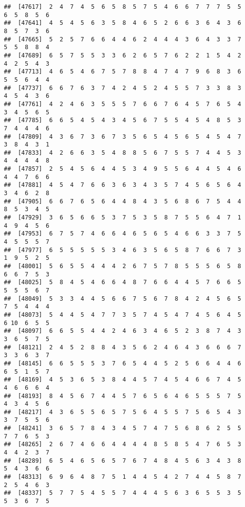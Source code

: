 \documentclass[
]{book}
\begin{document}
\begin{verbatim}
##  [47617]  2  4  7  4  5  6  5  8  5  7  5  4  6  6  7  7  7  5  5  6  5  8  5  6
##  [47641]  4  5  4  5  6  3  5  8  4  6  5  2  6  6  3  6  4  3  6  8  5  7  3  6
##  [47665]  5  2  5  7  6  6  4  4  6  2  4  4  4  3  6  4  3  3  7  5  5  8  8  4
##  [47689]  6  5  7  5  5  3  3  6  2  6  5  7  6  2  2  1  5  4  2  4  2  5  4  3
##  [47713]  4  6  5  4  6  7  5  7  8  8  4  7  4  7  9  6  8  3  6  5  5  6  4  4
##  [47737]  6  6  7  6  3  7  4  2  4  5  2  4  5  5  7  3  3  8  3  4  5  4  3  6
##  [47761]  4  2  4  6  3  5  5  5  7  6  6  7  6  4  5  7  6  5  4  3  4  5  6  5
##  [47785]  6  6  5  4  5  4  3  4  5  6  7  5  5  4  5  4  8  5  3  7  4  4  4  6
##  [47809]  4  3  6  7  3  6  7  3  5  6  5  4  5  6  5  4  5  4  7  3  8  4  3  1
##  [47833]  4  2  6  6  3  5  4  8  8  5  6  7  5  5  7  4  4  5  3  4  4  4  4  8
##  [47857]  2  5  4  5  6  4  4  5  3  4  9  5  5  6  4  4  5  4  6  4  4  7  6  6
##  [47881]  4  5  4  7  6  6  3  6  3  4  3  5  7  4  5  6  5  6  4  3  4  6  2  8
##  [47905]  6  6  7  6  5  6  4  4  8  4  3  5  6  8  6  7  5  4  4  8  5  3  4  5
##  [47929]  3  6  5  6  6  5  3  7  5  3  5  8  7  5  5  6  4  7  1  4  9  4  5  6
##  [47953]  6  7  5  7  4  6  6  4  6  5  6  5  4  6  6  3  3  7  5  4  5  5  5  7
##  [47977]  6  5  5  5  5  5  3  4  6  3  5  6  5  8  7  6  6  7  3  1  9  5  2  5
##  [48001]  5  6  5  5  4  4  4  2  6  7  5  7  8  5  5  5  6  5  8  6  6  7  5  3
##  [48025]  5  8  4  5  4  6  6  4  8  7  6  6  4  4  5  7  6  6  5  5  5  5  6  7
##  [48049]  5  3  3  4  4  5  6  6  7  5  6  7  8  4  2  4  5  6  5  7  5  4  4  4
##  [48073]  5  4  4  5  4  7  7  3  5  7  4  5  4  7  4  5  6  4  5  6 10  6  5  5
##  [48097]  6  6  5  5  4  4  2  4  6  3  4  6  5  2  3  8  7  4  3  3  6  5  7  5
##  [48121]  2  4  5  2  8  8  4  3  5  6  2  4  6  4  3  6  6  6  7  3  3  6  3  7
##  [48145]  6  6  5  5  5  3  7  6  5  4  4  5  2  5  6  6  4  4  6  6  5  1  5  7
##  [48169]  4  5  3  6  5  3  8  4  4  5  7  4  5  4  6  6  7  4  5  4  6  6  6  4
##  [48193]  8  4  5  6  7  4  4  5  7  6  5  6  4  6  5  5  5  7  5  4  3  4  5  6
##  [48217]  4  3  6  5  5  6  5  7  5  6  4  5  5  7  5  6  5  4  3  3  7  5  5  6
##  [48241]  3  6  5  7  8  4  3  4  5  7  4  7  5  6  8  6  2  5  5  7  7  6  5  3
##  [48265]  2  6  7  4  6  6  4  4  4  4  8  5  8  5  4  7  6  5  3  4  4  2  3  7
##  [48289]  6  5  4  6  5  6  5  7  6  7  4  8  4  5  6  3  4  3  8  5  4  3  6  6
##  [48313]  6  9  6  4  8  7  5  1  4  4  5  4  2  7  4  4  5  8  7  2  5  4  6  3
##  [48337]  5  7  7  5  4  5  5  7  4  4  4  5  6  3  6  5  5  3  5  5  3  6  7  5

\end{verbatim}
\end{document}
